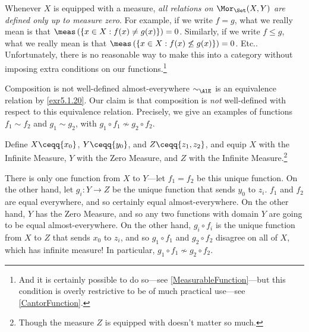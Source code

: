 \begin{important}
Whenever $X$ is equipped with a measure, \emph{all relations on $\Mor _{\Set}(X,Y)$ are defined only up to measure zero}.  For example, if we write $f=g$, what we really mean is that $\meas \left( \{ x\in X:f(x)\neq g(x)\} \right) =0$.  Similarly, if we write $f\leq g$, what we really mean is that $\meas \left( \{ x\in X:f(x)\not \leq g(x)\} \right) =0$.  Etc..  Unfortunately, there is no reasonable way to make this into a category without imposing extra conditions on our functions.\footnote{And it is certainly possible to do so---see \cref{MeasurableFunction}---but this condition is overly restrictive to be of much practical use---see \cref{CantorFunction}.}
\end{important}
\begin{exm}{Composition is not well-defined almost-everywhere}{}
$\sim _{\AlE}$ is an equivalence relation by \cref{exr5.1.20}.  Our claim is that composition is \emph{not} well-defined with respect to this equivalence relation.  Precisely, we give an examples of functions $f_1\sim f_2$ and $g_1\sim g_2$, with $g_1\circ f_1\not \sim g_2\circ f_2$.

Define $X\ceqq \{ x_0\}$, $Y\ceqq \{ y_0\}$, and $Z\ceqq \{ z_1,z_2\}$, and equip $X$ with the Infinite Measure, $Y$ with the Zero Measure, and $Z$ with the Infinite Measure.\footnote{Though the measure $Z$ is equipped with doesn't matter so much.}

There is only one function from $X$ to $Y$---let $f_1=f_2$ be this unique function.  On the other hand, let $g_i\colon Y\rightarrow Z$ be the unique function that sends $y_0$ to $z_i$.  $f_1$ and $f_2$ are equal everywhere, and so certainly equal almost-everywhere.  On the other hand, $Y$ has the Zero Measure, and so any two functions with domain $Y$ are going to be equal almost-everywhere.  On the other hand, $g_i\circ f_i$ is the unique function from $X$ to $Z$ that sends $x_0$ to $z_i$, and so $g_1\circ f_1$ and $g_2\circ f_2$ disagree on all of $X$, which has infinite measure!  In particular, $g_1\circ f_1\not \sim g_2\circ f_2$.
\end{exm}

